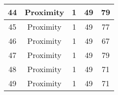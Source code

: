 \documentclass[results.tex]{subfiles}
\begin{document}
\begin{center}
\begin{tabular}{| c || c | c | c | c |}
            \hline
            44                      & Proximity                    & 1                      & 49                      & 79                   \\
            \hline
            45                      & Proximity                    & 1                      & 49                      & 77                   \\
            \hline
            46                      & Proximity                    & 1                      & 49                      & 67                   \\
            \hline
            47                      & Proximity                    & 1                      & 49                      & 79                   \\
            \hline
            48                      & Proximity                    & 1                      & 49                      & 71                   \\
            \hline
            49                      & Proximity                    & 1                      & 49                      & 71                   \\
            \hline
        \end{tabular}
    \end{center}
\end{document}
